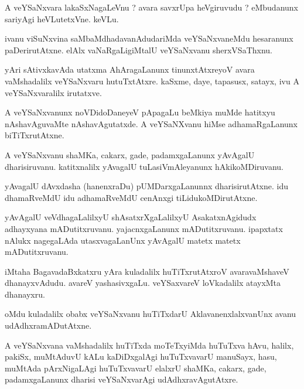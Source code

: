 \documentclass{article}
\begin{document}
\begin{mn}%
A veYSaNxvara lakaSxNagaLeVnu ? avara savxrUpa heVgiruvudu ? eMbudanunx sariyAgi heVLutetxVne. keVLu.
\end{mn}

\begin{mn}%
ivanu viSuNxvina saMbaMdhadavanAdudariMda veYSaNxvaneMdu hesaranunx paDerirutAtxne. elAlx 
vaNaRgaLigiMtalU veYSaNxvanu sherxVSaThxnu.
\end{mn}

\begin{mn}%
yAri sAtivxkavAda utatxma AhAragaLanunx tinunxtAtxreyoV avara vaMshadalilx veYSaNxvaru 
hutuTxtAtxre. kaSxme, daye, tapasusx, satayx, ivu A veYSaNxvaralilx irutatxve.
\end{mn}

\begin{mn}%
A veYSaNxvanunx noVDidoDaneyeV pApagaLu beMkiya muMde hatitxyu nAshavAguvaMte nAshavAgutatxde. A 
veYSaNXvanu hiMse adhamaRgaLanunx biTiTxrutAtxne.
\end{mn}

\begin{mn}%
A veYSaNxvanu shaMKa, cakarx, gade, padamxgaLanunx yAvAgalU dharisiruvanu. katitxnalilx yAvagalU 
tuLasiVmAleyanunx hAkikoMDiruvanu.
\end{mn}

\begin{mn}%
yAvagalU dAvxdasha (hanenxraDu) pUMDarxgaLanunnx dharisirutAtxne. idu dhamaRveMdU idu adhamaRveMdU 
cenAnxgi tiLidukoMDirutAtxne.
\end{mn}

\begin{mn}%
yAvAgalU veVdhagaLalilxyU shAsatxrXgaLalilxyU AsakatxnAgidudx adhayxyana mADutitxruvanu. 
yajacnxgaLanunx mADutitxruvanu. ipapxtatx nAlukx nagegaLAda utasxvagaLanUnx yAvAgalU matetx matetx 
mADutitxruvanu.
\end{mn}

\begin{mn}%
iMtaha BagavadaBxkatxru yAra kuladalilx huTiTxrutAtxroV avaravaMshaveV dhanayxvAdudu. avareV 
yashasivxgaLu. veYSaxvareV loVkadalilx atayxMta dhanayxru.
\end{mn}

\begin{mn}%
oMdu kuladalilx obabx veYSaNxvanu huTiTxdarU AklavanenxlalxvanUnx avanu udAdhxramADutAtxne.
\end{mn}

\begin{mn}%
A veYSaNxvana vaMshadalilx huTiTxda moTeTxyiMda huTuTxva hAvu, halilx, pakiSx, muMtAduvU kALu 
kaDiDxgalAgi huTuTxvavarU manuSayx, hasu, muMtAda pArxNigaLAgi huTuTxvavarU elalxrU shaMKa, 
cakarx, gade, padamxgaLanunx dharisi veYSaNxvarAgi udAdhxravAgutAtxre.
\end{mn}
\end{document}
